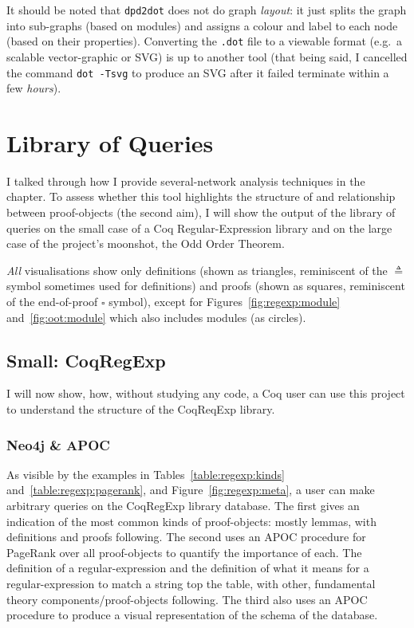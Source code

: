 It should be noted that \texttt{dpd2dot} does not do graph \emph{layout}: it
just splits the graph into sub-graphs (based on modules) and assigns a colour
and label to each node (based on their properties). Converting the
\texttt{.dot} file to a viewable format (e.g.\ a scalable vector-graphic or
SVG) is up to another tool (that being said, I cancelled the command
\texttt{dot -Tsvg} to produce an SVG after it failed terminate within a few
\emph{hours}).

\section{Library of Queries}\label{sec:libeval}

I talked through how I provide several-network analysis techniques in
the~ chapter. To assess whether this tool highlights the
structure of and relationship between proof-objects (the second aim), I will
show the output of the library of queries on the small case of a Coq
Regular-Expression library and on the large case of the project's moonshot, the
Odd Order Theorem.

\emph{All} visualisations show only definitions (shown as triangles,
reminiscent of the $\triangleq$ symbol sometimes used for definitions) and
proofs (shown as squares, reminiscent of the end-of-proof $\square$ symbol),
except for Figures~\ref{fig:regexp:module} and~\ref{fig:oot:module} which also
includes modules (as circles).

\subsection{Small: CoqRegExp}

I will now show, how, without studying any code, a Coq user can use this
project to understand the structure of the CoqReqExp library.

\subsubsection{Neo4j \& APOC}

As visible by the examples in Tables~\ref{table:regexp:kinds}
and~\ref{table:regexp:pagerank}, and Figure~\ref{fig:regexp:meta}, a user can
make arbitrary queries on the CoqRegExp library database. The first gives an
indication of the most common kinds of proof-objects: mostly lemmas, with
definitions and proofs following.  The second uses an APOC procedure for
PageRank over all proof-objects to quantify the importance of each. The
definition of a regular-expression and the definition of what it means for a
regular-expression to match a string top the table, with other, fundamental
theory components/proof-objects following. The third also uses an APOC
procedure to produce a visual representation of the schema of the database.


